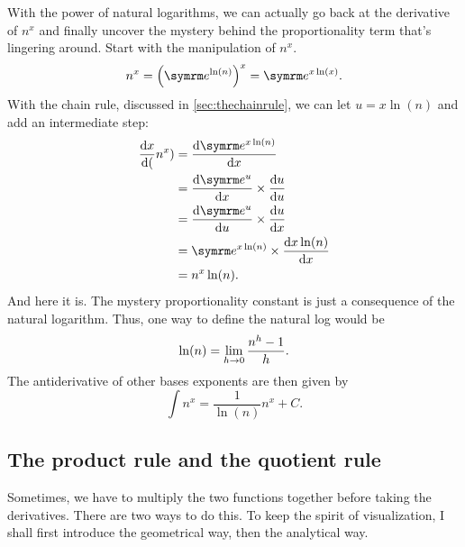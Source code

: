 With the power of natural logarithms, we can actually go back at the derivative of $n^x$ and finally uncover the mystery behind the proportionality term that's lingering around. Start with the manipulation of $n^x$.
\begin{equation}
    n^x = \left(\e^{\ln(n)}\right)^x = \e^{x\ln(x)}.
\end{equation}
With the chain rule, discussed in \cref{sec:thechainrule}, we can let $u = x\ln(n)$ and add an intermediate step:
\begin{align*}
    \odv{x}(n^x) &= \odv{\e^{x\ln(n)}}{x} \\
    &= \odv{\e^u}{x} \times \odv{u}{u} \\
    &= \odv{\e^u}{u} \times \odv{u}{x} \\
    &= \e^{x\ln(n)} \times \odv{x\ln(n)}{x} \\
    &= n^x\ln(n).
\end{align*}
And here it is. The mystery proportionality constant is just a consequence of the natural logarithm. Thus, one way to define the natural log would be
\begin{equation}
    \ln(n) = \lim_{h \rightarrow 0}\frac{n^h - 1}{h}.
\end{equation}
The antiderivative of other bases exponents are then given by
\begin{equation}
    \int n^x = \frac{1}{\ln(n)}n^x + C.
\end{equation}

\subsection{The product rule and the quotient rule}

Sometimes, we have to multiply the two functions together before taking the derivatives. There are two ways to do this. To keep the spirit of visualization, I shall first introduce the geometrical way, then the analytical way.

